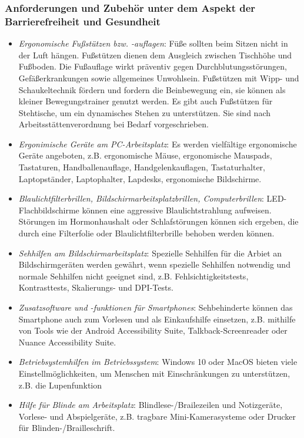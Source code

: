 \documentclass[a4paper, 12pt]{report}
\begin{document}
\subsubsection{Anforderungen und Zubehör unter dem Aspekt der Barrierefreiheit
und Gesundheit}

\begin{itemize}
    \item \emph{Ergonomische Fußstützen bzw. -auflagen}: Füße sollten beim
    Sitzen nicht in der Luft hängen. Fußstützen dienen dem Ausgleich zwischen
    Tischhöhe und Fußboden. Die Fußauflage wirkt präventiv gegen
    Durchblutungsstörungen, Gefäßerkrankungen sowie allgemeines Unwohlsein.
    Fußstützen mit Wipp- und Schaukeltechnik fördern und fordern die
    Beinbewegung ein, sie können als kleiner Bewegungstrainer genutzt werden.
    Es gibt auch Fußstützen für Stehtische, um ein dynamisches Stehen zu
    unterstützen. Sie sind nach Arbeitsstättenverordnung bei Bedarf
    vorgeschrieben.
    \item \emph{Ergonimische Geräte am PC-Arbeitsplatz}: Es werden vielfältige
    ergonomische Geräte angeboten, z.B. ergonomische Mäuse, ergonomische
    Mauspads, Tastaturen, Handballenauflage, Handgelenkauflagen, Tastaturhalter,
    Laptopständer, Laptophalter, Lapdesks, ergonomische Bildschirme.

    \item \emph{Blaulichtfilterbrillen, Bildschirmarbeitsplatzbrillen,
    Computerbrillen}: LED-Flachbildschirme können eine aggressive
    Blaulichtstrahlung aufweisen. Störungen im Hormonhaushalt oder
    Schlafstörungen können sich ergeben, die durch eine Filterfolie oder
    Blaulichtfilterbrille behoben werden können.
    \item \emph{Sehhilfen am Bildschirmarbeitsplatz}: Spezielle Sehhilfen für
    die Arbiet an Bildschirmgeräten werden gewährt, wenn spezielle Sehhilfen
    notwendig und normale Sehhilfen nicht geeignet sind, z.B.
    Fehlsichtigkeitstests, Kontrasttests, Skalierungs- und DPI-Tests.
    \item \emph{Zusatzsoftware und -funktionen für Smartphones}: Sehbehinderte
    können das Smartphone auch zum Vorlesen und als Einkaufshilfe einsetzen,
    z.B. mithilfe von Tools wie der Android Accessibility Suite,
    Talkback-Screenreader oder Nuance Accessibility Suite.
    \item \emph{Betriebsystemhilfen im Betriebssystem}: Windows 10 oder MacOS
    bieten viele Einstellmöglichkeiten, um Menschen mit Einschränkungen zu
    unterstützen, z.B. die Lupenfunktion
    \item \emph{Hilfe für Blinde am Arbeitsplatz}: Blindlese-/Brailezeilen und
    Notizgeräte, Vorlese- und Abspielgeräte, z.B. tragbare Mini-Kamerasysteme
    oder Drucker für Blinden-/Brailleschrift.
\end{itemize}
\end{document}
